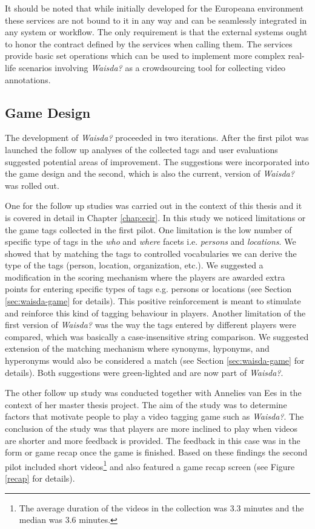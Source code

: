 It should be noted that while initially developed for the Europeana environment these services are not bound to it in any way and can be seamlessly integrated in any system or workflow. The only requirement is that the external systems ought to honor the contract defined by the services when calling them. The services provide basic set operations which can be used to implement more complex real-life scenarios involving \textit{Waisda?} as a crowdsourcing tool for collecting video annotations.
\subsection{Game Design}\label{chap:waisda:game-design}
The development of \textit{Waisda?} proceeded in two iterations. After the first pilot was launched the follow up analyses of the collected tags \cite{Annelies,ecir} and user evaluations suggested potential areas of improvement. The suggestions were incorporated into the game design and the second, which is also the current, version of \textit{Waisda?} was rolled out.

One for the follow up studies \cite{ecir} was carried out in the context of this thesis and it is covered in detail in Chapter \ref{chap:ecir}. In this study we noticed limitations or the game tags collected in the first pilot. One limitation is the low number of specific type of tags in the \textit{who} and \textit{where} facets i.e. \textit{persons} and \textit{locations}. We showed that by matching the tags to controlled vocabularies we can derive the type of the tags (person, location, organization, etc.). We suggested a modification in the scoring mechanism where the players are awarded extra points for entering specific types of tags e.g. persons or locations (see Section \ref{sec:waisda-game} for details). This positive reinforcement is meant to stimulate and reinforce this kind of tagging behaviour in players. Another limitation of the first version of \textit{Waisda?} was the way the tags entered by different players were compared, which was basically a case-insensitive string comparison. We suggested extension of the matching mechanism where synonyms, hyponyms, and hyperonyms would also be considered a match (see Section \ref{sec:waisda-game} for details). Both suggestions were green-lighted and are now part of \textit{Waisda?}.

The other follow up study \cite{Annelies} was conducted together with Annelies van Ees in the context of her master thesis project. The aim of the study was to determine factors that motivate people to play a video tagging game such as \textit{Waisda?}. The conclusion of the study was that players are more inclined to play when videos are shorter and more feedback is provided. The feedback in this case was in the form or game recap once the game is finished. Based on these findings the second pilot included short videos\footnote{The average duration of the videos in the collection was $3.3$ minutes and the median was $3.6$ minutes.} and also featured a game recap screen (see Figure \ref{recap} for details).

